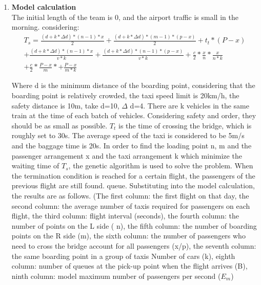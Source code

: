 \begin{enumerate}
\item \textbf{Model calculation}\\
The initial length of the team is 0, and the airport traffic is small in the morning.
considering:
\begin{equation}\begin{split} T_{s} = \frac{{(d+k*\Delta d)}*{(n-1)}*{x}}{2}+\frac{{(d+k*\Delta d)}*{(m-1)}*{(p-x)}}{2}+t_t*(P-x)\\+\frac{{(d+k*\Delta d)}*{(n-1)}*x}{v*k}+\frac{{(d+k*\Delta d)}*{(n-1)}*(p-x)}{v*k}+\frac{c}{2}*\frac{x}{n}*\frac{x}{n*k}\\+\frac{c}{2}*\frac{P-x}{m}*+\frac{P-x}{m*k}\end{split}\end{equation}

Where d is the minimum distance of the boarding point, considering that the boarding point is relatively crowded, the taxi speed limit is 20km/h, the safety distance is 10m, take d=10, $\Delta$ d=4. There are k vehicles in the same train at the time of each batch of vehicles. Considering safety and order, they should be as small as possible. $T_t$ is the time of crossing the bridge, which is roughly set to 30s. The average speed of the taxi is considered to be 5m/s and the baggage time is 20s.
In order to find the loading point n, m and the passenger arrangement x and the taxi arrangement k which minimize the waiting time of $T_s$, the genetic algorithm is used to solve the problem. When the termination condition is reached for a certain flight, the passengers of the previous flight are still found. queue.
Substituting into the model calculation, the results are as follows. (The first column: the first flight on that day, the second column: the average number of taxis required for passengers on each flight, the third column: flight interval (seconds), the fourth column: the number of points on the L side ( n), the fifth column: the number of boarding points on the R side (m), the sixth column: the number of passengers who need to cross the bridge account for all passengers (x/p), the seventh column: the same boarding point in a group of taxis Number of cars (k), eighth column: number of queues at the pick-up point when the flight arrives (B), ninth column: model maximum number of passengers per second ($E_m$)


\end{enumerate}
